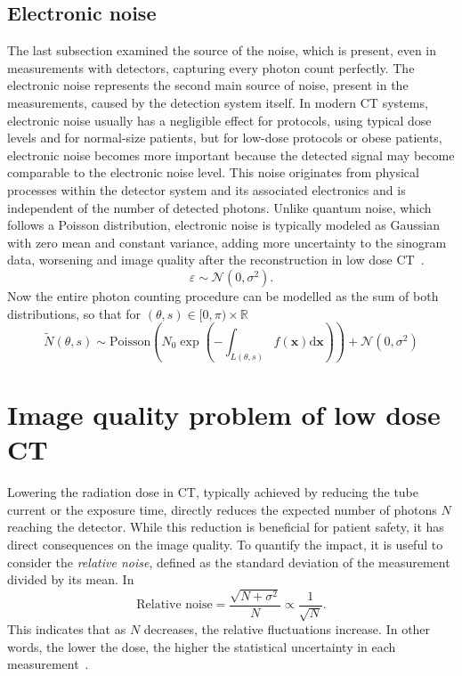 \documentclass[12pt,a4paper]{article}
\begin{document}
\subsection{Electronic noise}
The last subsection examined the source of the noise, which is present, even in measurements with detectors, capturing every photon count perfectly. The electronic noise represents the second main source of noise, present in the measurements, caused by the detection system itself.
\newline\newline
In modern CT systems, electronic noise usually has a negligible effect for protocols, using typical dose levels and for normal-size patients, but for low-dose protocols or obese patients, electronic noise becomes more important because the detected signal may become comparable to the electronic noise level. This noise originates from
physical processes within the detector system and its associated electronics and is independent of the number of detected photons. Unlike quantum noise, which follows a
Poisson distribution, electronic noise is typically modeled as Gaussian with zero mean and constant variance, adding more uncertainty to the sinogram data, worsening and image quality
after the reconstruction in low dose CT~\cite{Xie2017Robust}.
\begin{equation}
    \varepsilon \sim \mathcal N(0, \sigma^2).
\end{equation}
Now the entire photon counting procedure can be modelled as the sum of both distributions, so that for $(\theta, s) \in [0, \pi) \times \mathbb R$
\begin{equation}
    \tilde N(\theta, s) \sim \mathrm{Poisson}(N_0 \exp(-\int_{L(\theta, s)} f(\textbf{x}) \mathrm{d} \textbf{x})) + \mathcal{N}(0, \sigma^2)
\end{equation}

\section{Image quality problem of low dose CT}
Lowering the radiation dose in CT, typically achieved by reducing the tube current or the exposure time, directly reduces the expected number of photons \(N\) reaching the detector. While this reduction is beneficial for patient safety, it has direct consequences on the image quality.  
\newline\newline
To quantify the impact, it is useful to consider the \emph{relative noise}, defined as the standard deviation of the measurement divided by its mean. In 
\[
\text{Relative noise} = \frac{\sqrt{N+ \sigma^2}}{N} \propto \frac{1}{\sqrt{N}}.
\]
This indicates that as \(N\) decreases, the relative fluctuations increase. In other words, the lower the dose, the higher the statistical uncertainty in each measurement~\cite{Xie2017Robust}.  
\end{document}
